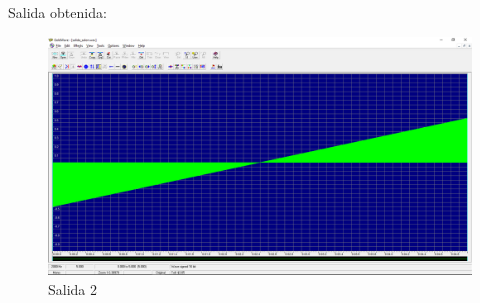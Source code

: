 Salida obtenida:
\begin{figure}[H]
	\centering
	\includegraphics[scale=.3]{img/salida2.png}
	\caption{Salida 2}
	\label{fig:salida2}		
\end{figure}